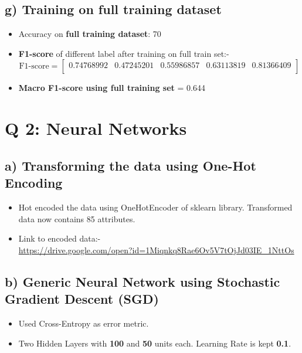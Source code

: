 \documentclass[12pt,letterpaper]{article}
\begin{document}
\subsection*{g) Training on full training dataset}
\begin{itemize}
    \item Accuracy on \textbf{full training dataset}:  70\ %
    \item \textbf{F1-score} of different label after training on full train set:-
    \[
    \text{F1-score}
    =
    \begin{bmatrix}
    0.74768992 & 0.47245201 & 0.55986857 & 0.63113819 & 0.81366409 \\
    \end{bmatrix}
    \]

    \item \textbf{Macro F1-score using full training set} = 0.644
\end{itemize}


\section*{Q 2: Neural Networks}
\subsection*{a) Transforming the data using One-Hot Encoding}
    \begin{itemize}
    \item Hot encoded the data using OneHotEncoder of sklearn library. Transformed data now contains 85 attributes.
    \item Link to encoded data:- \\ \url{https://drive.google.com/open?id=1Miqnkq8Rae6Ov5V7tOjJd03IE_1NttOs}
    \end{itemize}
\subsection*{b) Generic Neural Network using Stochastic Gradient Descent (SGD)}
    \begin{itemize}
    \item Used Cross-Entropy as error metric.
    \item Two Hidden Layers with \textbf{100} and \textbf{50} units each. Learning Rate is kept \textbf{0.1}.
    \end{itemize}
\end{document}
